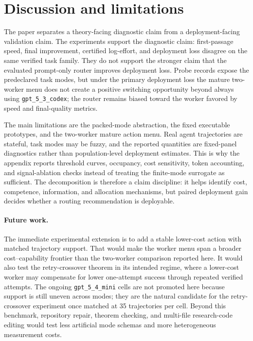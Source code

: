 \documentclass{article}
\begin{document}
\section{Discussion and limitations}
\label{sec:discussion}

The paper separates a theory-facing diagnostic claim from a deployment-facing validation claim.
The experiments support the diagnostic claim: first-passage speed, final improvement, certified log-effort, and deployment loss disagree on the same verified task family.
They do not support the stronger claim that the evaluated prompt-only router improves deployment loss.
Probe records expose the predeclared task modes, but under the primary deployment loss the mature two-worker menu does not create a positive switching opportunity beyond always using \texttt{gpt\_5\_3\_codex}; the router remains biased toward the worker favored by speed and final-quality metrics.

The main limitations are the packed-mode abstraction, the fixed executable prototypes, and the two-worker mature action menu.
Real agent trajectories are stateful, task modes may be fuzzy, and the reported quantities are fixed-panel diagnostics rather than population-level deployment estimates.
This is why the appendix reports threshold curves, occupancy, cost sensitivity, token accounting, and signal-ablation checks instead of treating the finite-mode surrogate as sufficient.
The decomposition is therefore a claim discipline: it helps identify cost, competence, information, and allocation mechanisms, but paired deployment gain decides whether a routing recommendation is deployable.

\paragraph{Future work.}
The immediate experimental extension is to add a stable lower-cost action with matched trajectory support.
That would make the worker menu span a broader cost--capability frontier than the two-worker comparison reported here.
It would also test the retry-crossover theorem in its intended regime, where a lower-cost worker may compensate for lower one-attempt success through repeated verified attempts.
The ongoing \texttt{gpt\_5\_4\_mini} cells are not promoted here because support is still uneven across modes; they are the natural candidate for the retry-crossover experiment once matched at 35 trajectories per cell.
Beyond this benchmark, repository repair, theorem checking, and multi-file research-code editing would test less artificial mode schemas and more heterogeneous measurement costs.
\end{document}
